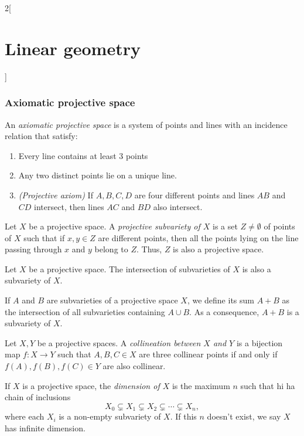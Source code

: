 \documentclass[class=article,10pt,crop=false]{standalone}
\begin{document}
\begin{multicols}{2}[\section{Linear geometry}]
\subsubsection{Axiomatic projective space}
\begin{definition}
An \textit{axiomatic projective space} is a system of points and lines with an incidence relation that satisfy:
\begin{enumerate}
    \item Every line contains at least 3 points
    \item Any two distinct points lie on a unique line.
    \item \textit{(Projective axiom)} If $A,B,C,D$ are four different points and lines $AB$ and $CD$ intersect, then lines $AC$ and $BD$ also intersect.
\end{enumerate}
\end{definition}
\begin{definition}
Let $X$ be a projective space. A \textit{projective subvariety of $X$} is a set $Z\ne\emptyset$ of points of $X$ such that if $x,y\in Z$ are different points, then all the points lying on the line passing through $x$ and $y$ belong to $Z$. Thus, $Z$ is also a projective space.
\end{definition}
\begin{prop}
Let $X$ be a projective space. The intersection of subvarieties of $X$ is also a subvariety of $X$.
\end{prop}
\begin{prop}
If $A$ and $B$ are subvarieties of a projective space $X$, we define its sum $A+B$ as the intersection of all subvarieties containing $A\cup B$. As a consequence, $A+B$ is a subvariety of $X$.
\end{prop}
\begin{definition}
Let $X,Y$ be a projective spaces. A \textit{collineation between $X$ and $Y$} is a bijection map $f:X\rightarrow Y$ such that $A,B,C\in X$ are three collinear points if and only if $f(A),f(B),f(C)\in Y$ are also collinear.
\end{definition}
\begin{definition}
If $X$ is a projective space, the \textit{dimension of $X$} is the maximum $n$ such that hi ha chain of inclusions $$X_0\varsubsetneq X_1\varsubsetneq X_2 \varsubsetneq\cdots\varsubsetneq X_n,$$ where each $X_i$ is a non-empty subvariety of $X$. If this $n$ doesn't exist, we say $X$ has infinite dimension.
\end{definition}
\begin{definition}

\end{definition}
\end{multicols}
\end{document}
